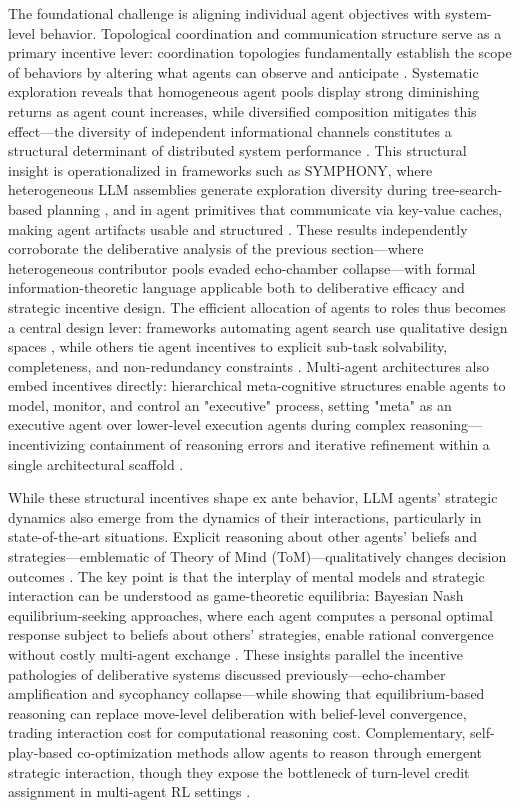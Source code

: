 \documentclass[11pt,a4paper]{article}
\begin{document}
The foundational challenge is aligning individual agent objectives with system-level behavior. Topological coordination and communication structure serve as a primary incentive lever: coordination topologies fundamentally establish the scope of behaviors by altering what agents can observe and anticipate \cite{arxiv:2512.08296v3}. Systematic exploration reveals that homogeneous agent pools display strong diminishing returns as agent count increases, while diversified composition mitigates this effect---the diversity of independent informational channels constitutes a structural determinant of distributed system performance \cite{arxiv:2602.03794v1}. This structural insight is operationalized in frameworks such as SYMPHONY, where heterogeneous LLM assemblies generate exploration diversity during tree-search-based planning \cite{arxiv:2601.22623v1}, and in agent primitives that communicate via key-value caches, making agent artifacts usable and structured \cite{arxiv:2602.03695v2}. These results independently corroborate the deliberative analysis of the previous section---where heterogeneous contributor pools evaded echo-chamber collapse---with formal information-theoretic language applicable both to deliberative efficacy and strategic incentive design. The efficient allocation of agents to roles thus becomes a central design lever: frameworks automating agent search use qualitative design spaces \cite{arxiv:2410.06153v3}, while others tie agent incentives to explicit sub-task solvability, completeness, and non-redundancy constraints \cite{arxiv:2410.02189v2}. Multi-agent architectures also embed incentives directly: hierarchical meta-cognitive structures enable agents to model, monitor, and control an "executive" process, setting "meta" as an executive agent over lower-level execution agents during complex reasoning---incentivizing containment of reasoning errors and iterative refinement within a single architectural scaffold \cite{arxiv:2503.09501v3}.

While these structural incentives shape ex ante behavior, LLM agents' strategic dynamics also emerge from the dynamics of their interactions, particularly in state-of-the-art situations. Explicit reasoning about other agents' beliefs and strategies---emblematic of Theory of Mind (ToM)---qualitatively changes decision outcomes \cite{arxiv:2603.00142v1}. The key point is that the interplay of mental models and strategic interaction can be understood as game-theoretic equilibria: Bayesian Nash equilibrium-seeking approaches, where each agent computes a personal optimal response subject to beliefs about others' strategies, enable rational convergence without costly multi-agent exchange \cite{arxiv:2506.08292v1}. These insights parallel the incentive pathologies of deliberative systems discussed previously---echo-chamber amplification and sycophancy collapse---while showing that equilibrium-based reasoning can replace move-level deliberation with belief-level convergence, trading interaction cost for computational reasoning cost. Complementary, self-play-based co-optimization methods allow agents to reason through emergent strategic interaction, though they expose the bottleneck of turn-level credit assignment in multi-agent RL settings \cite{arxiv:2603.06859v2}.
\end{document}
